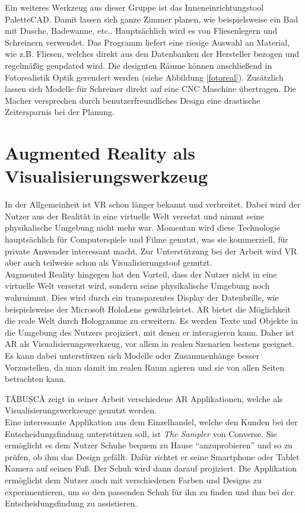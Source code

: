 Ein weiteres Werkzeug aus dieser Gruppe ist das Inneneinrichtungstool PaletteCAD. Damit lassen sich ganze Zimmer planen, wie beispielsweise ein Bad mit Dusche, Badewanne, etc.. Hauptsächlich wird es von Fliesenlegern und Schreinern verwendet. Das Programm liefert eine riesige Auswahl an Material, wie z.B. Fliesen, welches direkt aus den Datenbanken der Hersteller bezogen und regelmäßig geupdated wird. Die designten Räume können anschließend in Fotorealistik Optik gerendert werden (siehe Abbildung \ref{fotoreal}). Zusätzlich lassen sich Modelle für Schreiner direkt auf eine CNC Maschine übertragen. Die Macher versprechen durch benutzerfreundliches Design eine drastische Zeitersparnis bei der Planung.

\section{Augmented Reality als Visualisierungswerkzeug}

In der Allgemeinheit ist VR schon länger bekannt und verbreitet. Dabei wird der Nutzer aus der Realität in eine virtuelle Welt versetzt und nimmt seine physikalische Umgebung nicht mehr war. Momentan wird diese Technologie hauptsächlich für Computerspiele und Filme genutzt, was sie kommerziell, für private Anwender interessant macht. Zur Unterstützung bei der Arbeit wird VR aber auch teilweise schon als Visualisierungstool genutzt. \\
Augmented Reality hingegen hat den Vorteil, dass der Nutzer nicht in eine virtuelle Welt versetzt wird, sondern seine physikalische Umgebung noch wahrnimmt. Dies wird durch ein transparentes Display der Datenbrille, wie beispielsweise der Microsoft HoloLens gewährleistet. AR bietet die Möglichkeit die reale Welt durch Hologramme zu erweitern. Es werden Texte und Objekte in die Umgebung des Nutzers projiziert, mit denen er interagieren kann. Daher ist AR als Visualisierungswerkzeug, vor allem in realen Szenarien bestens geeignet. Es kann dabei unterstützen sich Modelle oder Zusammenhänge besser Vorzustellen, da man damit im realen Raum agieren und sie von allen Seiten betrachten kann.

TĂBUȘCĂ \cite{tabusca_augmented_2014} zeigt in seiner Arbeit verschiedene AR Applikationen, welche als Visualisierungswerkzeuge genutzt werden. \\
Eine interessante Applikation aus dem Einzelhandel, welche den Kunden bei der Entscheidungsfindung unterstützen soll, ist \textit{The Sampler} von Converse. Sie ermöglicht es dem Nutzer Schuhe bequem zu Hause \enquote{anzuprobieren} und so zu prüfen, ob ihm das Design gefällt. Dafür richtet er seine Smartphone oder Tablet Kamera auf seinen Fuß. Der Schuh wird dann darauf projiziert. Die Applikation ermöglicht dem Nutzer auch mit verschiedenen Farben und Designs zu experimentieren, um so den passenden Schuh für ihn zu finden und ihm bei der Entscheidungsfindung zu assistieren.

